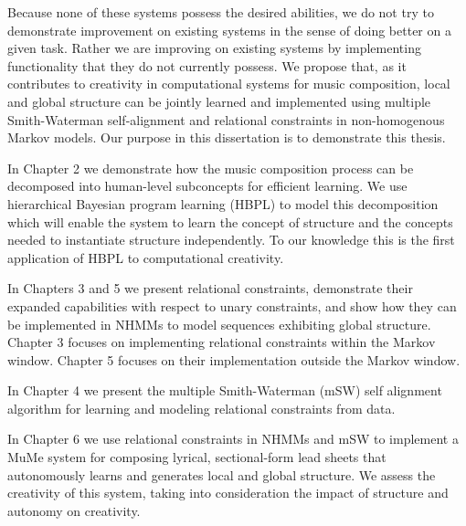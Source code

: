 \documentclass[phd,electronic,oneside,twosidetoc,letterpaper,chaptercenter,parttop,lol,lof,lot]{byumsphd}
\begin{document}
Because none of these systems possess the desired abilities, we do not try to demonstrate improvement on existing systems in the sense of doing better on a given task. Rather we are improving on existing systems by implementing functionality that they do not currently possess. We propose that, as it contributes to creativity in computational systems for music composition, local and global structure can be jointly learned and implemented using multiple Smith-Waterman self-alignment and relational constraints in non-homogenous Markov models. Our purpose in this dissertation is to demonstrate this thesis.

In Chapter 2 we demonstrate how the music composition process can be decomposed into human-level subconcepts for efficient learning. We use hierarchical Bayesian program learning (HBPL) to model this decomposition which will enable the system to learn the concept of structure and the concepts needed to instantiate structure independently. To our knowledge this is the first application of HBPL to computational creativity.

In Chapters 3 and 5 we present relational constraints, demonstrate their expanded capabilities with respect to unary constraints, and show how they can be implemented in NHMMs to model sequences exhibiting global structure. Chapter 3 focuses on implementing relational constraints within the Markov window. Chapter 5 focuses on their implementation outside the Markov window.

In Chapter 4 we present the multiple Smith-Waterman (mSW) self alignment algorithm for learning and modeling relational constraints from data.

In Chapter 6 we use relational constraints in NHMMs and mSW to implement a MuMe system for composing lyrical, sectional-form lead sheets that autonomously learns and generates local and global structure. We assess the creativity of this system, taking into consideration the impact of structure and autonomy on creativity.
\end{document}
